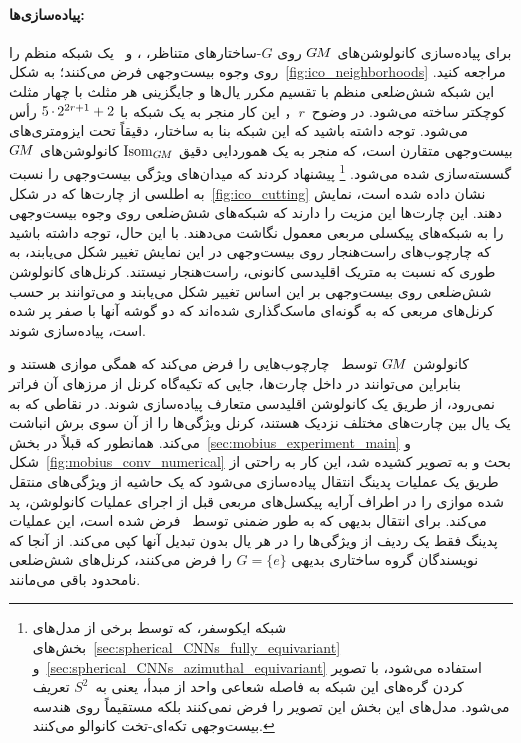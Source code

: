 \paragraph{پیاده‌سازی‌ها:}
برای پیاده‌سازی کانولوشن‌های $G\mkern-1.4muM$ روی $G$-ساختارهای متناظر،
\citet{liu2018icoAltAz}، \citet{zhang2019orientation} و~\citet{gaugeIco2019}
یک شبکه منظم را روی وجوه بیست‌وجهی فرض می‌کنند؛ به شکل~\ref{fig:ico_neighborhoods} مراجعه کنید.
این شبکه شش‌ضلعی منظم با تقسیم مکرر یال‌ها و جایگزینی هر مثلث با چهار مثلث کوچکتر ساخته می‌شود.
در وضوح~$r$， این کار منجر به یک شبکه با ${5\mkern-1mu\cdot\mkern-1mu 2^{2r+1} + 2}$ رأس می‌شود.
توجه داشته باشید که این شبکه بنا به ساختار، دقیقاً تحت ایزومتری‌های بیست‌وجهی متقارن است، که منجر به یک هموردایی دقیق $\operatorname{Isom}_{G\mkern-1.4muM}$ کانولوشن‌های $G\mkern-1.4muM$ گسسته‌سازی شده می‌شود.%
\footnote{
	شبکه ایکوسفر، که توسط برخی از مدل‌های بخش‌های~\ref{sec:spherical_CNNs_fully_equivariant} و~\ref{sec:spherical_CNNs_azimuthal_equivariant} استفاده می‌شود، با تصویر کردن گره‌های این شبکه به فاصله شعاعی واحد از مبدأ، یعنی به~$S^2$ تعریف می‌شود.
	مدل‌های این بخش این تصویر را فرض نمی‌کنند بلکه مستقیماً روی هندسه بیست‌وجهی تکه‌ای-تخت کانوالو می‌کنند.
}
\citet{liu2018icoAltAz} پیشنهاد کردند که میدان‌های ویژگی بیست‌وجهی را نسبت به اطلسی از چارت‌ها که در شکل~\ref{fig:ico_cutting} نشان داده شده است، نمایش دهند.
این چارت‌ها این مزیت را دارند که شبکه‌های شش‌ضلعی روی وجوه بیست‌وجهی را به شبکه‌های پیکسلی مربعی معمول نگاشت می‌دهند.
با این حال، توجه داشته باشید که چارچوب‌های راست‌هنجار روی بیست‌وجهی در این نمایش تغییر شکل می‌یابند، به طوری که نسبت به متریک اقلیدسی کانونی، راست‌هنجار نیستند.
کرنل‌های کانولوشن شش‌ضلعی روی بیست‌وجهی بر این اساس تغییر شکل می‌یابند و می‌توانند بر حسب کرنل‌های مربعی که به گونه‌ای ماسک‌گذاری شده‌اند که دو گوشه آنها با صفر پر شده است، پیاده‌سازی شوند.


کانولوشن $G\mkern-1.4muM$ توسط~\citet{liu2018icoAltAz} چارچوب‌هایی را فرض می‌کند که همگی موازی هستند و بنابراین می‌توانند در داخل چارت‌ها، جایی که تکیه‌گاه کرنل از مرزهای آن فراتر نمی‌رود، از طریق یک کانولوشن اقلیدسی متعارف پیاده‌سازی شوند.
در نقاطی که به یک یال بین چارت‌های مختلف نزدیک هستند، کرنل ویژگی‌ها را از آن سوی برش انباشت می‌کند.
همانطور که قبلاً در بخش~\ref{sec:mobius_experiment_main} و شکل~\ref{fig:mobius_conv_numerical} بحث و به تصویر کشیده شد، این کار به راحتی از طریق یک عملیات پدینگ انتقال پیاده‌سازی می‌شود که یک حاشیه از ویژگی‌های منتقل شده موازی را در اطراف آرایه پیکسل‌های مربعی قبل از اجرای عملیات کانولوشن، پد می‌کند.
برای انتقال بدیهی که به طور ضمنی توسط~\citet{liu2018icoAltAz} فرض شده است، این عملیات پدینگ فقط یک ردیف از ویژگی‌ها را در هر یال بدون تبدیل آنها کپی می‌کند.
از آنجا که نویسندگان گروه ساختاری بدیهی $G=\{e\}$ را فرض می‌کنند، کرنل‌های شش‌ضلعی نامحدود باقی می‌مانند.


